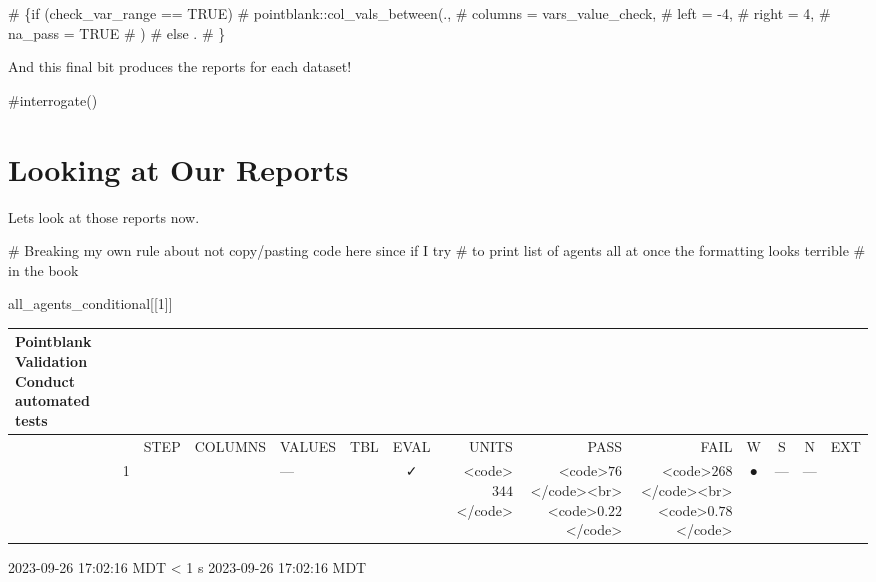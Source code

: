 \documentclass[
  letterpaper,
  DIV=11,
  numbers=noendperiod]{scrreprt}
\newenvironment{Shaded}{\begin{snugshade}}{\end{snugshade}}
\newcommand{\CommentTok}[1]{\textcolor[rgb]{0.37,0.37,0.37}{#1}}
\newcommand{\DecValTok}[1]{\textcolor[rgb]{0.68,0.00,0.00}{#1}}
\newcommand{\NormalTok}[1]{\textcolor[rgb]{0.00,0.23,0.31}{#1}}
\begin{document}
\begin{Shaded}
\begin{Highlighting}[]
\CommentTok{\# \{if (check\_var\_range == TRUE)}
\CommentTok{\#         pointblank::col\_vals\_between(.,}
\CommentTok{\#           columns = vars\_value\_check,}
\CommentTok{\#           left = {-}4,}
\CommentTok{\#           right = 4,}
\CommentTok{\#           na\_pass = TRUE}
\CommentTok{\#         )}
\CommentTok{\#         else .}
\CommentTok{\#         \}}
\end{Highlighting}
\end{Shaded}

And this final bit produces the reports for each dataset!

\begin{Shaded}
\begin{Highlighting}[]
\CommentTok{\#interrogate()}
\end{Highlighting}
\end{Shaded}

\hypertarget{looking-at-our-reports}{%
\section{Looking at Our Reports}\label{looking-at-our-reports}}

Lets look at those reports now.

\begin{Shaded}
\begin{Highlighting}[]
\CommentTok{\# Breaking my own rule about not copy/pasting code here since if I try }
\CommentTok{\# to print list of agents all at once the formatting looks terrible }
\CommentTok{\# in the book}

\NormalTok{all\_agents\_conditional[[}\DecValTok{1}\NormalTok{]]}
\end{Highlighting}
\end{Shaded}

\setlength{\LTpost}{0mm}
\begin{longtable}{lrlllccrrrcccc}
\caption*{
{\large Pointblank Validation} \\ 
{\small Conduct automated tests}
} \\ 
\toprule
 &  & STEP & COLUMNS & VALUES & TBL & EVAL & UNITS & PASS & FAIL & W & S & N & EXT \\ 
\midrule
 & 1 &  &  & — &                                                              & ✓ & <code>$344$</code> & <code>$76$</code><br><code>$0.22$</code> & <code>$268$</code><br><code>$0.78$</code> & ● & --- & --- &  \\ 
\bottomrule
\end{longtable}
\begin{minipage}{\linewidth}
2023-09-26 17:02:16 MDT
\textless{} 1 s
2023-09-26 17:02:16 MDT\\
\end{minipage}
\end{document}
